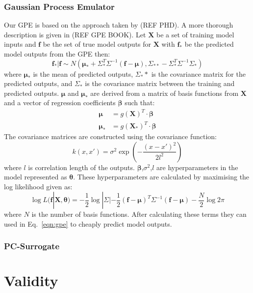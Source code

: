 \documentclass[12pt,a4paper]{article}
\begin{document}
\subsubsection{Gaussian Process Emulator}
\noindent
Our GPE is based on the approach taken by (REF PHD). A more thorough description is given in (REF GPE BOOK). Let $\bm{X}$ be a set of training model inputs and $\bm{f}$ be the set of true model outputs for $\bm{X}$ with $\bm{f}_*$ be the predicted model outputs from the GPE then:
\begin{equation}\label{eqn:gpe}
	\bm{f_*}|\bm{f}\sim N(\bm{\mu}_* + \Sigma_*^T\Sigma^{-1}(\bm{f}-\bm{\mu}),
	\Sigma_{**}-\Sigma_*^T\Sigma^{-1}\Sigma_*)
\end{equation}
where $\bm{\mu}_*$ is the mean of predicted outputs, $\Sigma_**$ is the covariance matrix for the predicted outputs, and $\Sigma_*$ is the covariance matrix between the training and predicted outputs. $\bm{\mu}$ and $\bm{\mu}_*$ are derived from a matrix of basis functions from $\bm{X}$ and a vector of regression coefficients $\bm{\beta}$ such that:
\begin{align}
	\bm{\mu} &= g(\bm{X})^T\cdot \bm{\beta} \\
	\bm{\mu}_* &= g(\bm{X}_*)^T\cdot \bm{\beta}
\end{align}
The covariance matrices are constructed using the covariance function:
\begin{equation}
	k(x,x')=\sigma^2\exp\left( -\frac{(x-x')^2}{2l^2}\right)
\end{equation}
where $l$ is correlation length of the outputs. $\bm{\beta}$,$\sigma^2$,$l$ are hyperparameters in the model represented as $\bm{\theta}$. These hyperparameters are calculated by maximising the log likelihood given as:
\begin{equation}
	\log L(\bm{f}|\bm{X},\bm{\theta})=-\frac{1}{2}\log|\Sigma|-\frac{1}{2}(\bm{f}-\bm{\mu})^T
	\Sigma^{-1}(\bm{f}-\bm{\mu})-\frac{N}{2}\log2\pi
\end{equation}
where $N$ is the number of basis functions. After calculating these terms they can used in Eq.~\eqref{eqn:gpe} to cheaply predict model outputs.
\subsubsection{PC-Surrogate}
\section{Validity} \label{sec:val}


\end{document}
